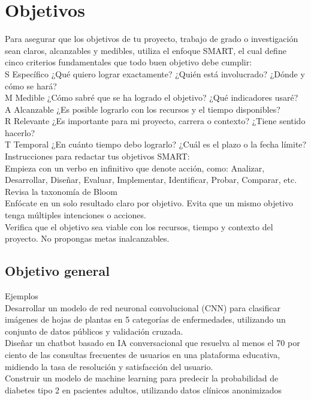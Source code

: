 \chapter{Objetivos}
Para asegurar que los objetivos de tu proyecto, trabajo de grado o investigación sean claros, alcanzables y medibles, utiliza el enfoque SMART, el cual define cinco criterios fundamentales que todo buen objetivo debe cumplir: \\[1cm]
S	Específico	¿Qué quiero lograr exactamente? ¿Quién está involucrado? ¿Dónde y cómo se hará?\\[1cm]
M	Medible	¿Cómo sabré que se ha logrado el objetivo? ¿Qué indicadores usaré?\\[1cm]
A	Alcanzable	¿Es posible lograrlo con los recursos y el tiempo disponibles?\\[1cm]
R	Relevante	¿Es importante para mi proyecto, carrera o contexto? ¿Tiene sentido hacerlo?\\[1cm]
T	Temporal	¿En cuánto tiempo debo lograrlo? ¿Cuál es el plazo o la fecha límite?\\[1cm]

 Instrucciones para redactar tus objetivos SMART:\\[1cm]
Empieza con un verbo en infinitivo que denote acción, como: Analizar, Desarrollar, Diseñar, Evaluar, Implementar, Identificar, Probar, Comparar, etc. Revisa la taxonomía de Bloom
\\[1cm]
Enfócate en un solo resultado claro por objetivo. Evita que un mismo objetivo tenga múltiples intenciones o acciones.
\\[1cm]
Verifica que el objetivo sea viable con los recursos, tiempo y contexto del proyecto. No propongas metas inalcanzables.


\section{Objetivo general}
Ejemplos\\[1cm]
Desarrollar un modelo de red neuronal convolucional (CNN) para clasificar imágenes de hojas de plantas en 5 categorías de enfermedades, utilizando un conjunto de datos públicos y validación cruzada.
\\[1cm]
Diseñar un chatbot basado en IA conversacional que resuelva al menos el 70 por ciento de las consultas frecuentes de usuarios en una plataforma educativa, midiendo la tasa de resolución y satisfacción del usuario.
\\[1cm]
Construir un modelo de machine learning para predecir la probabilidad de diabetes tipo 2 en pacientes adultos, utilizando datos clínicos anonimizados

